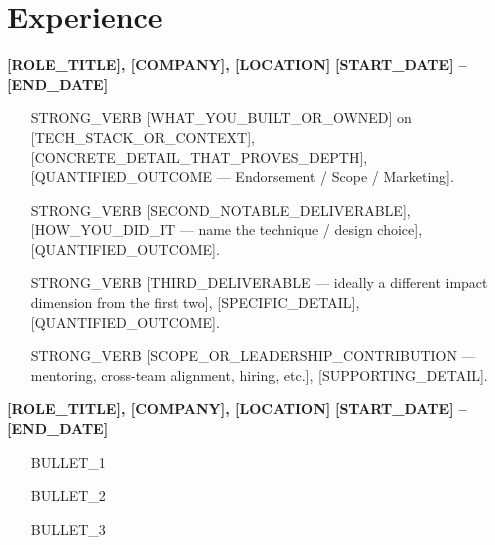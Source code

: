 \documentclass[11pt,a4paper,sans]{moderncv}
\begin{document}
\section{Experience}

\textbf{[ROLE_TITLE], [COMPANY], [LOCATION]} \hfill \textbf{[START_DATE] -- [END_DATE]} \\
\vspace{-1.2em}
\begin{itemize}
  \item [STRONG_VERB] [WHAT_YOU_BUILT_OR_OWNED] on [TECH_STACK_OR_CONTEXT], [CONCRETE_DETAIL_THAT_PROVES_DEPTH], [QUANTIFIED_OUTCOME --- Endorsement / Scope / Marketing].
  \item [STRONG_VERB] [SECOND_NOTABLE_DELIVERABLE], [HOW_YOU_DID_IT --- name the technique / design choice], [QUANTIFIED_OUTCOME].
  \item [STRONG_VERB] [THIRD_DELIVERABLE --- ideally a different impact dimension from the first two], [SPECIFIC_DETAIL], [QUANTIFIED_OUTCOME].
  \item [STRONG_VERB] [SCOPE_OR_LEADERSHIP_CONTRIBUTION --- mentoring, cross-team alignment, hiring, etc.], [SUPPORTING_DETAIL].
\end{itemize}
\vspace{0.5em}


\textbf{[ROLE_TITLE], [COMPANY], [LOCATION]} \hfill \textbf{[START_DATE] -- [END_DATE]} \\
\vspace{-1.2em}
\begin{itemize}
  \item [BULLET_1]
  \item [BULLET_2]
  \item [BULLET_3]
\end{itemize}
\vspace{0.5em}


%
\end{document}
